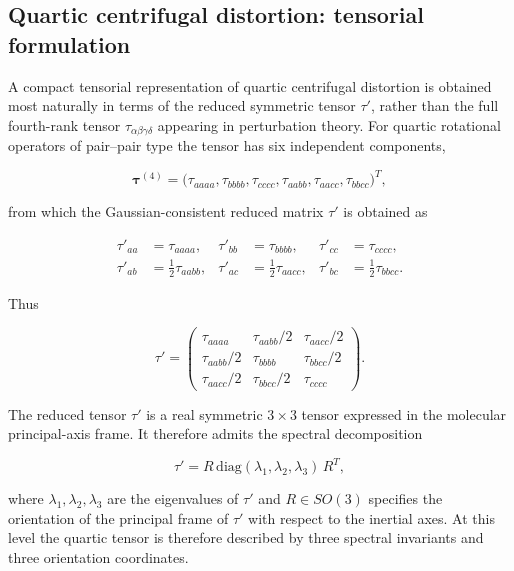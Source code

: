 \subsection{Quartic centrifugal distortion: tensorial formulation}

A compact tensorial representation of quartic centrifugal distortion is
obtained most naturally in terms of the reduced symmetric tensor
$\tau'$, rather than the full fourth-rank tensor
$\tau_{\alpha\beta\gamma\delta}$ appearing in perturbation theory.
For quartic rotational operators of pair--pair type the tensor has six
independent components,

\[
\boldsymbol\tau^{(4)}=
\bigl(
\tau_{aaaa},\tau_{bbbb},\tau_{cccc},
\tau_{aabb},\tau_{aacc},\tau_{bbcc}
\bigr)^T,
\]

from which the Gaussian-consistent reduced matrix $\tau'$ is obtained as

\begin{align}
\tau'_{aa} &= \tau_{aaaa}, &
\tau'_{bb} &= \tau_{bbbb}, &
\tau'_{cc} &= \tau_{cccc}, \\
\tau'_{ab} &= \tfrac12 \tau_{aabb}, &
\tau'_{ac} &= \tfrac12 \tau_{aacc}, &
\tau'_{bc} &= \tfrac12 \tau_{bbcc}.
\end{align}

Thus

\begin{equation}
\tau'=
\begin{pmatrix}
\tau_{aaaa} & \tau_{aabb}/2 & \tau_{aacc}/2 \\
\tau_{aabb}/2 & \tau_{bbbb} & \tau_{bbcc}/2 \\
\tau_{aacc}/2 & \tau_{bbcc}/2 & \tau_{cccc}
\end{pmatrix}.
\label{eq:tauprime_matrix}
\end{equation}

The reduced tensor $\tau'$ is a real symmetric $3\times3$ tensor
expressed in the molecular principal-axis frame.
It therefore admits the spectral decomposition

\begin{equation}
\tau' = R\,\mathrm{diag}(\lambda_1,\lambda_2,\lambda_3)\,R^{T},
\label{eq:tauprime_spectral}
\end{equation}

where $\lambda_1,\lambda_2,\lambda_3$ are the eigenvalues of $\tau'$
and $R\in SO(3)$ specifies the orientation of the principal frame of
$\tau'$ with respect to the inertial axes.
At this level the quartic tensor is therefore described by three
spectral invariants and three orientation coordinates.

